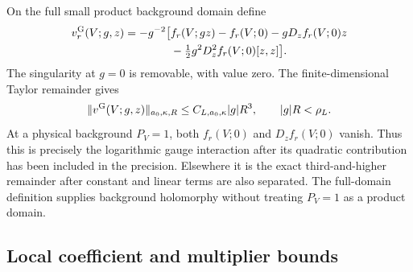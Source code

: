 \documentclass[11pt]{article}
\theoremstyle{remark}
\begin{document}
On the full small product background domain define
\begin{equation}\label{pm-gauge-remainder}
 \begin{split}
 v_r^{\rm G}(V;g,z)=-g^{-2}\bigl[
 &f_r(V;gz)-f_r(V;0)-gD_zf_r(V;0)z\\
 &-\tfrac12g^2D_z^2f_r(V;0)[z,z]\bigr].
 \end{split}
\end{equation}
The singularity at $g=0$ is removable, with value zero.
The finite-dimensional Taylor remainder gives
\begin{equation}\label{pm-gauge-bound}
 \|v^{\rm G}(V;g,z)\|_{a_0,\kappa,R}
 \le C_{L,a_0,\kappa}|g|R^3,
 \qquad |g|R<\rho_L.
\end{equation}
At a physical background $P_V=1$, both $f_r(V;0)$ and
$D_zf_r(V;0)$ vanish. Thus this is precisely the logarithmic
gauge interaction after its quadratic contribution has been
included in the precision. Elsewhere it is the exact
third-and-higher remainder after constant and linear terms
are also separated. The full-domain definition supplies
background holomorphy without treating $P_V=1$ as a product
domain.

\subsection{Local coefficient and multiplier bounds}
\label{pm-coefficients-section}
\end{document}
